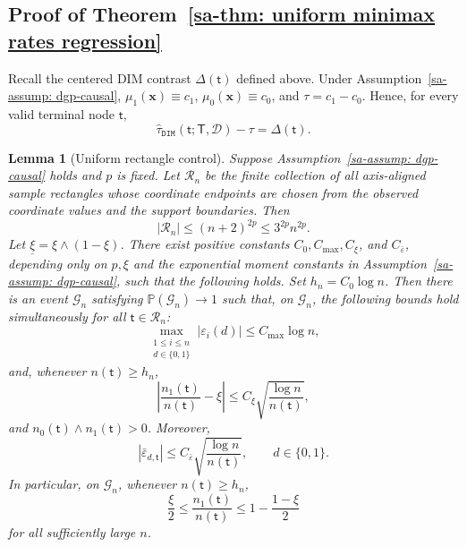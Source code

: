 \documentclass[10pt]{article}
\def\treeT{\mathsf{T}}
\def\nodet{\mathsf{t}}
\def\bx{\mathbf{x}}
\def\P{\mathbb{P}}
\def\dataD{\mathcal{D}}
\def\DIM{\mathtt{DIM}}
\newtheorem{lemma}[theorem]{Lemma}
\theoremstyle{definition}
\theoremstyle{remark}
\begin{document}
\subsection{Proof of Theorem~\ref{sa-thm: uniform minimax rates regression}}

Recall the centered DIM contrast $\Delta(\nodet)$ defined above. Under Assumption~\ref{sa-assump: dgp-causal}, $\mu_1(\bx)\equiv c_1$, $\mu_0(\bx)\equiv c_0$, and $\tau=c_1-c_0$. Hence, for every valid terminal node $\nodet$,
\[
    \hat\tau_{\DIM}(\nodet;\treeT,\dataD)-\tau
    =
    \Delta(\nodet).
\]

\begin{lemma}[Uniform rectangle control]\label{sa-lem:uniform-rectangle-control-arm-transfer}
Suppose Assumption~\ref{sa-assump: dgp-causal} holds and $p$ is fixed. Let $\mathcal R_n$ be the finite collection of all axis-aligned sample rectangles whose coordinate endpoints are chosen from the observed coordinate values and the support boundaries. Then
\[
    |\mathcal R_n|\leq (n+2)^{2p}\leq 3^{2p}n^{2p}.
\]
Let $\underline\xi=\xi\wedge(1-\xi)$. There exist positive constants
$C_0,C_{\max},C_{\xi}$, and $C_{\bar\varepsilon}$, depending only on
$p,\xi$ and the exponential moment constants in
Assumption~\ref{sa-assump: dgp-causal}, such that the following holds. Set
$h_n=C_0\log n$. Then there is an event $\mathcal G_n$ satisfying
$\P(\mathcal G_n)\to1$ such that, on $\mathcal G_n$, the following bounds hold
simultaneously for all $\nodet\in\mathcal R_n$:
\[
    \max_{\substack{1\leq i\leq n\\ d\in\{0,1\}}}
    |\varepsilon_i(d)|
    \leq C_{\max}\log n,
\]
and, whenever $n(\nodet)\geq h_n$,
\[
    \left|
        \frac{n_1(\nodet)}{n(\nodet)}-\xi
    \right|
    \leq
    C_{\xi}\sqrt{\frac{\log n}{n(\nodet)}},
\]
and $n_0(\nodet)\wedge n_1(\nodet)>0$. Moreover,
\[
    |\bar\varepsilon_{d,\nodet}|
    \leq
    C_{\bar\varepsilon}\sqrt{\frac{\log n}{n(\nodet)}},
    \qquad d\in\{0,1\}.
\]
In particular, on $\mathcal G_n$, whenever $n(\nodet)\geq h_n$,
\[
    \frac{\xi}{2}
    \leq
    \frac{n_1(\nodet)}{n(\nodet)}
    \leq
    1-\frac{1-\xi}{2}
\]
for all sufficiently large $n$.
\end{lemma}
\end{document}
